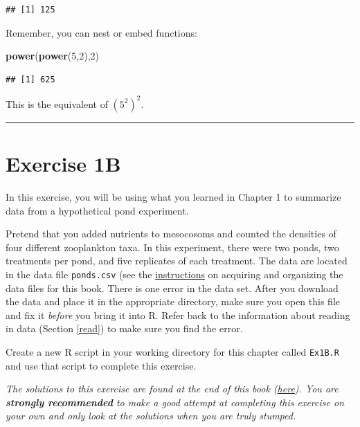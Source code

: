 \documentclass[]{book}
\newenvironment{Shaded}{\begin{snugshade}}{\end{snugshade}}
\newcommand{\DecValTok}[1]{\textcolor[rgb]{0.00,0.00,0.81}{#1}}
\newcommand{\KeywordTok}[1]{\textcolor[rgb]{0.13,0.29,0.53}{\textbf{#1}}}
\newcommand{\NormalTok}[1]{#1}
\begin{document}
\begin{verbatim}
## [1] 125
\end{verbatim}

Remember, you can nest or embed functions:

\begin{Shaded}
\begin{Highlighting}[]
\KeywordTok{power}\NormalTok{(}\KeywordTok{power}\NormalTok{(}\DecValTok{5}\NormalTok{,}\DecValTok{2}\NormalTok{),}\DecValTok{2}\NormalTok{)}
\end{Highlighting}
\end{Shaded}

\begin{verbatim}
## [1] 625
\end{verbatim}

This is the equivalent of \((5^2)^2\).

\begin{center}\rule{0.5\linewidth}{\linethickness}\end{center}

\hypertarget{ex1b}{%
\section*{Exercise 1B}\label{ex1b}}

In this exercise, you will be using what you learned in Chapter 1 to summarize data from a hypothetical pond experiment.

Pretend that you added nutrients to mesocosoms and counted the densities of four different zooplankton taxa. In this experiment, there were two ponds, two treatments per pond, and five replicates of each treatment. The data are located in the data file \texttt{ponds.csv} (see the \protect\hyperlink{data-sets}{instructions} on acquiring and organizing the data files for this book. There is one error in the data set. After you download the data and place it in the appropriate directory, make sure you open this file and fix it \emph{before} you bring it into R. Refer back to the information about reading in data (Section \ref{read}) to make sure you find the error.

Create a new R script in your working directory for this chapter called \texttt{Ex1B.R} and use that script to complete this exercise.

\emph{The solutions to this exercise are found at the end of this book (\protect\hyperlink{ex1b-answers}{here}). You are \textbf{strongly recommended} to make a good attempt at completing this exercise on your own and only look at the solutions when you are truly stumped.}
\end{document}
